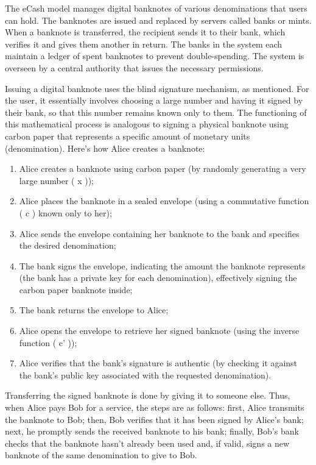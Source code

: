 \documentclass[
  a5paper,
  smalldemyvopaper,10pt,twoside,onecolumn,openright,extrafontsizes,hidelinks]{memoir}
\providecommand{\tightlist}{%
  \setlength{\itemsep}{0pt}\setlength{\parskip}{0pt}}\usepackage{longtable,booktabs,array}
\begin{document}
The eCash model manages digital banknotes of various denominations that
users can hold. The banknotes are issued and replaced by servers called
banks or mints. When a banknote is transferred, the recipient sends it
to their bank, which verifies it and gives them another in return. The
banks in the system each maintain a ledger of spent banknotes to prevent
double-spending. The system is overseen by a central authority that
issues the necessary permissions.

Issuing a digital banknote uses the blind signature mechanism, as
mentioned. For the user, it essentially involves choosing a large number
and having it signed by their bank, so that this number remains known
only to them. The functioning of this mathematical process is analogous
to signing a physical banknote using carbon paper that represents a
specific amount of monetary units (denomination). Here's how Alice
creates a banknote:

\begin{enumerate}
\def\labelenumi{\arabic{enumi}.}
\tightlist
\item
  Alice creates a banknote using carbon paper (by randomly generating a
  very large number ( x ));
\item
  Alice places the banknote in a sealed envelope (using a commutative
  function ( c ) known only to her);
\item
  Alice sends the envelope containing her banknote to the bank and
  specifies the desired denomination;
\item
  The bank signs the envelope, indicating the amount the banknote
  represents (the bank has a private key for each denomination),
  effectively signing the carbon paper banknote inside;
\item
  The bank returns the envelope to Alice;
\item
  Alice opens the envelope to retrieve her signed banknote (using the
  inverse function ( c' ));
\item
  Alice verifies that the bank's signature is authentic (by checking it
  against the bank's public key associated with the requested
  denomination).
\end{enumerate}

Transferring the signed banknote is done by giving it to someone else.
Thus, when Alice pays Bob for a service, the steps are as follows:
first, Alice transmits the banknote to Bob; then, Bob verifies that it
has been signed by Alice's bank; next, he promptly sends the received
banknote to his bank; finally, Bob's bank checks that the banknote
hasn't already been used and, if valid, signs a new banknote of the same
denomination to give to Bob.
\end{document}
